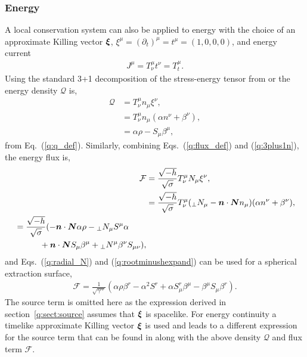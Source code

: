 \subsubsection{Energy} \label{q:sect:energy}
A local conservation system can also be applied to energy with the choice of an approximate Killing vector $\boldsymbol{\xi}$, $\xi^\mu = (\partial_t)^\mu = t^\mu =(1,0,0,0)$, and energy current
\begin{align}
\label{q:energycurrent} J^\mu = T^\mu_\nu t^\nu = T^\mu_t.
\end{align}
 Using the standard 3+1 decomposition of the stress-energy tensor from \cite{gourgoulhon20073+} or \cite{alcubierre2008introduction} the energy density $\mathcal{Q}$ is,
\begin{align}
\mathcal{Q} &= T^\mu_\nu n_\mu \xi^\nu, \\
            &= T^\mu_\nu n_\mu (\alpha n^\nu+ \beta^\nu), \\
            &= \alpha \rho - S_\mu \beta^\mu,
\end{align}
from Eq.~(\ref{q:q_def}). Similarly, combining Eqs.~(\ref{q:flux_def}) and (\ref{q:3plus1n}), the energy flux is,
\begin{align}\mathcal{F} &= \frac{\sqrt{-h}}{\sqrt{\sigma}}T^\mu_\nu N_\mu \xi^\nu, \\
            &= \frac{\sqrt{-h}}{\sqrt{\sigma}}T^\mu_\nu ({}_{\perp}N_\mu - \boldsymbol{n}\cdot \boldsymbol{N} n_\mu) (\alpha n^\nu + \beta^\nu), \\
    \begin{split} &= \frac{\sqrt{-h}}{\sqrt{\sigma}}(-\boldsymbol{n}\cdot \boldsymbol{N}\alpha\rho -  {}_{\perp}N_\mu S^\mu \alpha \\&\quad\quad\quad+ \boldsymbol{n}\cdot \boldsymbol{N} S_\mu \beta^\mu + {}_{\perp}N^\mu \beta^\nu S_{\mu\nu}), \end{split}
\end{align}
and Eqs.~(\ref{q:radial_N}) and (\ref{q:rootminushexpand}) can be used for a spherical extraction surface,
\begin{align}
 \mathcal{F} = \frac{1}{\sqrt{\gamma^{rr}}}(\alpha \rho \beta^r - \alpha^2 S^r   +  \alpha S^r_\mu\beta^\mu - \beta^\mu S_\mu \beta^r ).
\end{align}
 The source term is omitted here as the expression derived in section~\ref{q:sect:source} assumes that $\boldsymbol{\xi}$ is spacelike. For energy continuity a timelike approximate Killing vector $\boldsymbol{\xi}$ is used and leads to a different expression for the source term that can be found in \cite{Clough_2021} along with the above density $\mathcal{Q}$ and flux term $\mathcal{F}$.

















